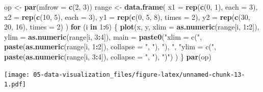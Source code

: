 \documentclass[
  11pt,
]{krantz}
\newenvironment{Shaded}{\begin{snugshade}}{\end{snugshade}}
\newcommand{\ControlFlowTok}[1]{\textcolor[rgb]{0.27,0.27,0.27}{\textbf{#1}}}
\newcommand{\DataTypeTok}[1]{\textcolor[rgb]{0.27,0.27,0.27}{#1}}
\newcommand{\DecValTok}[1]{\textcolor[rgb]{0.06,0.06,0.06}{#1}}
\newcommand{\KeywordTok}[1]{\textcolor[rgb]{0.27,0.27,0.27}{\textbf{#1}}}
\newcommand{\NormalTok}[1]{#1}
\newcommand{\OperatorTok}[1]{\textcolor[rgb]{0.43,0.43,0.43}{\textbf{#1}}}
\newcommand{\StringTok}[1]{\textcolor[rgb]{0.5,0.5,0.5}{#1}}
\begin{document}
\footnotesize

\begin{Shaded}
\begin{Highlighting}[]
\NormalTok{op <-}\StringTok{ }\KeywordTok{par}\NormalTok{(}\DataTypeTok{mfrow =} \KeywordTok{c}\NormalTok{(}\DecValTok{2}\NormalTok{, }\DecValTok{3}\NormalTok{))}
\NormalTok{range <-}\StringTok{ }\KeywordTok{data.frame}\NormalTok{(}
  \DataTypeTok{x1 =} \KeywordTok{rep}\NormalTok{(}\KeywordTok{c}\NormalTok{(}\DecValTok{0}\NormalTok{, }\DecValTok{1}\NormalTok{), }\DataTypeTok{each =} \DecValTok{3}\NormalTok{),}
  \DataTypeTok{x2 =} \KeywordTok{rep}\NormalTok{(}\KeywordTok{c}\NormalTok{(}\DecValTok{10}\NormalTok{, }\DecValTok{5}\NormalTok{), }\DataTypeTok{each =} \DecValTok{3}\NormalTok{), }
  \DataTypeTok{y1 =} \KeywordTok{rep}\NormalTok{(}\KeywordTok{c}\NormalTok{(}\DecValTok{0}\NormalTok{, }\DecValTok{5}\NormalTok{, }\DecValTok{8}\NormalTok{), }\DataTypeTok{times =} \DecValTok{2}\NormalTok{), }
  \DataTypeTok{y2 =} \KeywordTok{rep}\NormalTok{(}\KeywordTok{c}\NormalTok{(}\DecValTok{30}\NormalTok{, }\DecValTok{20}\NormalTok{, }\DecValTok{16}\NormalTok{), }\DataTypeTok{times =} \DecValTok{2}\NormalTok{)}
\NormalTok{  )}
\ControlFlowTok{for}\NormalTok{ (i }\ControlFlowTok{in} \DecValTok{1}\OperatorTok{:}\DecValTok{6}\NormalTok{) \{}
  \KeywordTok{plot}\NormalTok{(x, y, }
       \DataTypeTok{xlim =} \KeywordTok{as.numeric}\NormalTok{(range[i, }\DecValTok{1}\OperatorTok{:}\DecValTok{2}\NormalTok{]), }
       \DataTypeTok{ylim =} \KeywordTok{as.numeric}\NormalTok{(range[i, }\DecValTok{3}\OperatorTok{:}\DecValTok{4}\NormalTok{]), }
       \DataTypeTok{main =} \KeywordTok{paste0}\NormalTok{(}\StringTok{"xlim = c("}\NormalTok{, }
                     \KeywordTok{paste}\NormalTok{(}\KeywordTok{as.numeric}\NormalTok{(range[i, }\DecValTok{1}\OperatorTok{:}\DecValTok{2}\NormalTok{]), }
                           \DataTypeTok{collapse =} \StringTok{", "}\NormalTok{), }\StringTok{"), "}\NormalTok{, }
                     \StringTok{"ylim = c("}\NormalTok{, }
                     \KeywordTok{paste}\NormalTok{(}\KeywordTok{as.numeric}\NormalTok{(range[i, }\DecValTok{3}\OperatorTok{:}\DecValTok{4}\NormalTok{]), }
                           \DataTypeTok{collapse =} \StringTok{", "}\NormalTok{), }\StringTok{")"}\NormalTok{)}
\NormalTok{       )}
\NormalTok{\}}
\KeywordTok{par}\NormalTok{(op)}
\end{Highlighting}
\end{Shaded}

\texttt{[image: 05-data-visualization\_files/figure-latex/unnamed-chunk-13-1.pdf]}
\end{document}

